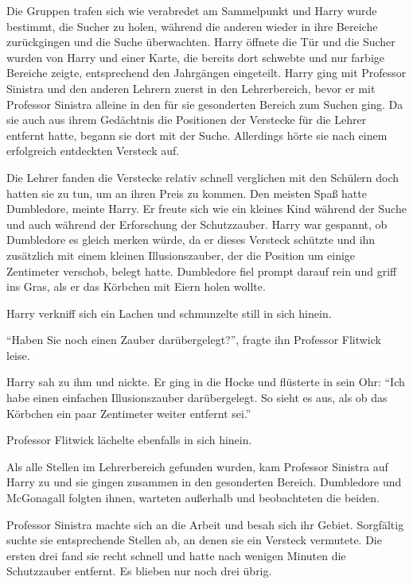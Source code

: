 Die Gruppen trafen sich wie verabredet am Sammelpunkt und Harry wurde bestimmt, die Sucher zu holen, während die anderen wieder in ihre Bereiche zurückgingen und die Suche überwachten. Harry öffnete die Tür und die Sucher wurden von Harry und einer Karte, die bereits dort schwebte und nur farbige Bereiche zeigte, entsprechend den Jahrgängen eingeteilt. Harry ging mit Professor Sinistra und den anderen Lehrern zuerst in den Lehrerbereich, bevor er mit Professor Sinistra alleine in den für sie gesonderten Bereich zum Suchen ging. Da sie auch aus ihrem Gedächtnis die Positionen der Verstecke für die Lehrer entfernt hatte, begann sie dort mit der Suche. Allerdings hörte sie nach einem erfolgreich entdeckten Versteck auf.

Die Lehrer fanden die Verstecke relativ schnell \gst verglichen mit den Schülern \gst doch hatten sie zu tun, um an ihren Preis zu kommen. Den meisten Spaß hatte Dumbledore, meinte Harry. Er freute sich wie ein kleines Kind während der Suche und auch während der Erforschung der Schutzzauber. Harry war gespannt, ob Dumbledore es gleich merken würde, da er dieses Versteck schützte und ihn zusätzlich mit einem kleinen Illusionszauber, der die Position um einige Zentimeter verschob, belegt hatte. Dumbledore fiel prompt darauf rein und griff ins Gras, als er das Körbchen mit Eiern holen wollte.

Harry verkniff sich ein Lachen und schmunzelte still in sich hinein.

\enquote{Haben Sie noch einen Zauber darübergelegt?}, fragte ihn Professor Flitwick leise.

Harry sah zu ihm und nickte. Er ging in die Hocke und flüsterte in sein Ohr: \enquote{Ich habe einen einfachen Illusionszauber darübergelegt. So sieht es aus, als ob das Körbchen ein paar Zentimeter weiter entfernt sei.}

Professor Flitwick lächelte ebenfalls in sich hinein.

Als alle Stellen im Lehrerbereich gefunden wurden, kam Professor Sinistra auf Harry zu und sie gingen zusammen in den gesonderten Bereich. Dumbledore und McGonagall folgten ihnen, warteten außerhalb und beobachteten die beiden.

Professor Sinistra machte sich an die Arbeit und besah sich ihr Gebiet. Sorgfältig suchte sie entsprechende Stellen ab, an denen sie ein Versteck vermutete. Die ersten drei fand sie recht schnell und hatte nach wenigen Minuten die Schutzzauber entfernt. Es blieben nur noch drei übrig.

